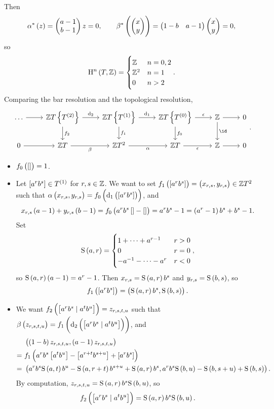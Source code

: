Then
$$ \alpha^*\br{z} = \twobyone{a - 1}{b - 1}z = 0, \qquad \beta^*\br{\twobyone{x}{y}} = \onebytwo{1 - b}{a - 1}\twobyone{x}{y} = 0, $$
so
$$ \H^n\br{T, \ZZ} =
\begin{cases}
\ZZ & n = 0, 2 \\
\ZZ^2 & n = 1 \\
0 & n > 2
\end{cases}.
$$
Comparing the bar resolution and the topological resolution,
$$
\begin{tikzcd}
\dots \arrow{r} & \ZZ T\cbr{T^{\br{2}}} \arrow{r}{\d_2} \arrow{d}{f_2} & \ZZ T\cbr{T^{\br{1}}} \arrow{r}{\d_1} \arrow{d}{f_1} & \ZZ T\cbr{T^{\br{0}}} \arrow{r}{\epsilon} \arrow{d}{f_0} & \ZZ \arrow{r} \arrow{d}{\id} & 0 \\
0 \arrow{r} & \ZZ T \arrow{r}[swap]{\beta} & \ZZ T^2 \arrow{r}[swap]{\alpha} & \ZZ T \arrow{r}[swap]{\epsilon} & \ZZ \arrow{r} & 0
\end{tikzcd}.
$$
\begin{itemize}
\item $ f_0\br{\sbr{}} = 1 $.
\item Let $ \sbr{a^rb^s} \in T^{\br{1}} $ for $ r, s \in \mathbb{Z} $. We want to set $ f_1\br{\sbr{a^rb^s}} = \br{x_{r, s}, y_{r, s}} \in \ZZ T^2 $ such that $ \alpha\br{x_{r, s}, y_{r, s}} = f_0\br{\d_1\br{\sbr{a^rb^s}}} $, and
$$ x_{r, s}\br{a - 1} + y_{r, s}\br{b - 1} = f_0\br{a^rb^s\sbr{} - \sbr{}} = a^rb^s - 1 = \br{a^r - 1}b^s + b^s - 1. $$
Set
$$ \S\br{a, r} =
\begin{cases}
1 + \dots + a^{r - 1} & r > 0 \\
0 & r = 0 \\
-a^{-1} - \dots - a^r & r < 0
\end{cases},
$$
so $ \S\br{a, r}\br{a - 1} = a^r - 1 $. Then $ x_{r, s} = \S\br{a, r}b^s $ and $ y_{r, s} = \S\br{b, s} $, so
$$ f_1\br{\sbr{a^rb^s}} = \br{\S\br{a, r}b^s, \S\br{b, s}}. $$
\item We want $ f_2\br{\sbr{a^rb^s \mid a^tb^u}} = z_{r, s, t, u} $ such that $ \beta\br{z_{r, s, t, u}} = f_1\br{\d_2\br{\sbr{a^rb^s \mid a^tb^u}}} $, and
\begin{align*}
& \br{\br{1 - b}z_{r, s, t, u}, \br{a - 1}z_{r, s, t, u}} \\
= \ & f_1\br{a^rb^s\sbr{a^tb^u} - \sbr{a^{r + t}b^{s + u}} + \sbr{a^rb^s}} \\
= \ & \br{a^rb^s\S\br{a, t}b^u - \S\br{a, r + t}b^{s + u} + \S\br{a, r}b^s, a^rb^s\S\br{b, u} - \S\br{b, s + u} + \S\br{b, s}}.
\end{align*}
By computation, $ z_{r, s, t, u} = \S\br{a, r}b^s\S\br{b, u} $, so
$$ f_2\br{\sbr{a^rb^s \mid a^tb^u}} = \S\br{a, r}b^s\S\br{b, u}. $$
\end{itemize}
